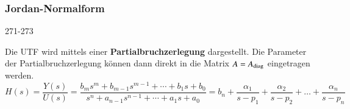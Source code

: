 

\subsubsection{Jordan-Normalform}{271-273}

Die UTF wird mittels einer \textbf{Partialbruchzerlegung} dargestellt. Die Parameter der Partialbruchzerlegung können dann
direkt in die Matrix $A = A_{\rm diag}$ eingetragen werden.
$$ H(s) = \frac{Y(s)}{U(s)} = \frac{b_m s^m + b_{m-1} s^{m-1} + \cdots + b_1 s + b_0}
{s^n + a_{n-1} s^{n-1} + \cdots + a_1 s + a_0} = b_n + \frac{\alpha_1}{s - p_1} + \frac{\alpha_2}{s - p_2} + \ldots + \frac{\alpha_n}{s - p_n}$$

